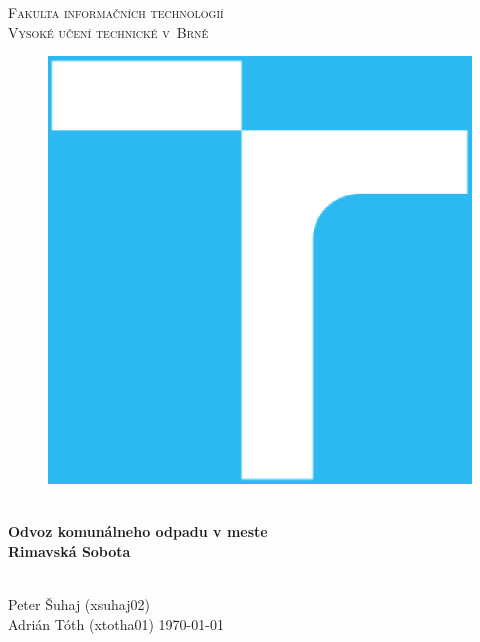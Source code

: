 \documentclass[11pt,a4paper]{article}
\begin{document}

\begin{titlepage}
    \begin{center}
        \Huge
        \textsc{
            Fakulta informačních technologií\\
            Vysoké učení technické v~Brně
        }
        \vspace{100px}
        \begin{figure}[!h]
            \centering
            \includegraphics[scale=0.3]{vutbr-fit-logo.eps}
        \end{figure}
        \\[25mm]
        \huge{
            \textbf{
                Odvoz komunálneho odpadu v meste\\
                Rimavská Sobota
            }
        }
        \vfill
    \end{center}
        \Large{
            \hfill\\
            Peter Šuhaj (xsuhaj02)\\
            Adrián Tóth (xtotha01) \hfill \today
        }

\end{titlepage}
\end{document}
